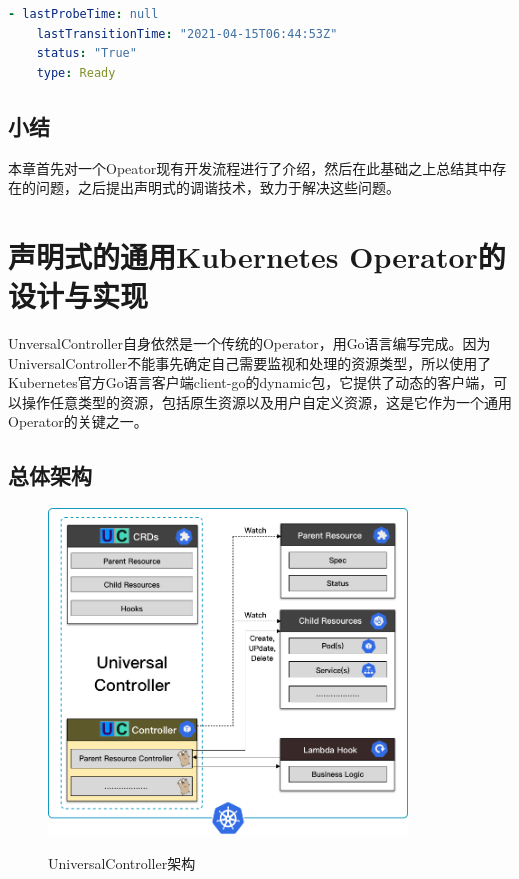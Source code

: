 \documentclass[macfonts,master]{njuthesis}
\begin{document}
\begin{lstlisting}[language=YAML,caption=状态Ready为True,label=listing:ready]
  - lastProbeTime: null
    lastTransitionTime: "2021-04-15T06:44:53Z"
    status: "True"
    type: Ready
\end{lstlisting}

\section{小结}

本章首先对一个Opeator现有开发流程进行了介绍，然后在此基础之上总结其中存在的问题，之后提出声明式的调谐技术，致力于解决这些问题。

\chapter{声明式的通用Kubernetes Operator的设计与实现}\label{chapter_implement}
UnversalController自身依然是一个传统的Operator，用Go语言编写完成。因为UniversalController不能事先确定自己需要监视和处理的资源类型，所以使用了Kubernetes官方Go语言客户端client-go的dynamic包，它提供了动态的客户端，可以操作任意类型的资源，包括原生资源以及用户自定义资源，这是它作为一个通用Operator的关键之一。

\section{总体架构}

\begin{figure}[htbp]
  \centering
  \includegraphics[width= 0.85\textwidth]{pics/uc-arch.png}\\
  \caption{UniversalController架构}\label{fig:uc-arch}
\end{figure}
\end{document}
